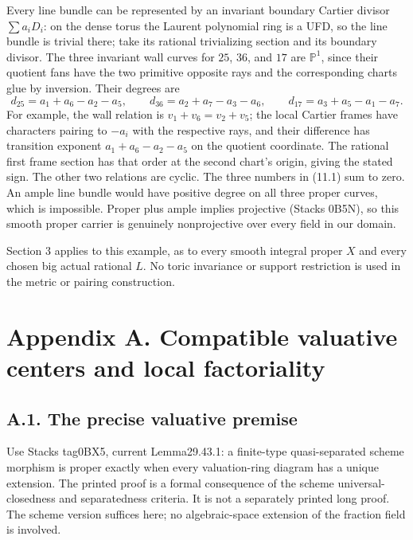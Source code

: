 \documentclass[
  10pt,
]{article}
\begin{document}
Every line bundle can be represented by an invariant boundary Cartier
divisor \(\sum a_iD_i\): on the dense torus the Laurent polynomial ring
is a UFD, so the line bundle is trivial there; take its rational
trivializing section and its boundary divisor. The three invariant wall
curves for \(25\), \(36\), and \(17\) are \(\mathbb P^1\), since their
quotient fans have the two primitive opposite rays and the corresponding
charts glue by inversion. Their degrees are \[
d_{25}=a_1+a_6-a_2-a_5,\qquad
d_{36}=a_2+a_7-a_3-a_6,\qquad
d_{17}=a_3+a_5-a_1-a_7.                                \tag{11.1}
\] For example, the wall relation is \(v_1+v_6=v_2+v_5\); the local
Cartier frames have characters pairing to \(-a_i\) with the respective
rays, and their difference has transition exponent \(a_1+a_6-a_2-a_5\)
on the quotient coordinate. The rational first frame section has that
order at the second chart's origin, giving the stated sign. The other
two relations are cyclic. The three numbers in (11.1) sum to zero. An
ample line bundle would have positive degree on all three proper curves,
which is impossible. Proper plus ample implies projective (Stacks 0B5N),
so this smooth proper carrier is genuinely nonprojective over every
field in our domain.

Section 3 applies to this example, as to every smooth integral proper
\(X\) and every chosen big actual rational \(L\). No toric invariance or
support restriction is used in the metric or pairing construction.

\section{Appendix A. Compatible valuative centers and local
factoriality}\label{appendix-a.-compatible-valuative-centers-and-local-factoriality}

\subsection{A.1. The precise valuative
premise}\label{a.1.-the-precise-valuative-premise}

Use Stacks tag0BX5, current Lemma29.43.1: a finite-type quasi-separated
scheme morphism is proper exactly when every valuation-ring diagram has
a unique extension. The printed proof is a formal consequence of the
scheme universal-closedness and separatedness criteria. It is not a
separately printed long proof. The scheme version suffices here; no
algebraic-space extension of the fraction field is involved.
\end{document}
